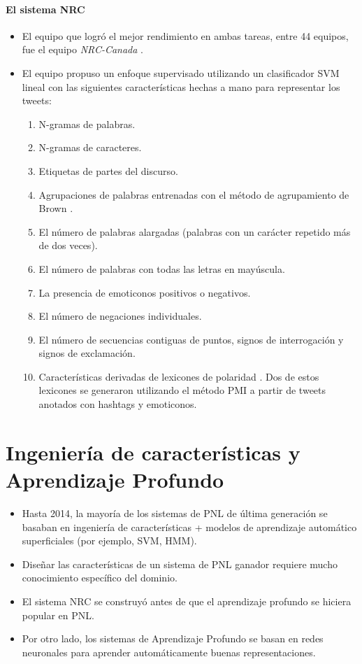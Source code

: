 \documentclass{book}
\begin{document}
\paragraph{El sistema NRC}
\begin{itemize}
   \item El equipo que logró el mejor rendimiento en ambas tareas, entre 44 equipos, fue el equipo \emph{NRC-Canada} \cite{Mohammad2013}.
   \item El equipo propuso un enfoque supervisado utilizando un clasificador SVM lineal con las siguientes características hechas a mano para representar los tweets:
   \begin{enumerate}
      \item N-gramas de palabras.
      \item N-gramas de caracteres.
      \item Etiquetas de partes del discurso.
      \item Agrupaciones de palabras entrenadas con el método de agrupamiento de Brown \cite{brown1992class}.
      \item El número de palabras alargadas (palabras con un carácter repetido más de dos veces).
      \item El número de palabras con todas las letras en mayúscula.
      \item La presencia de emoticonos positivos o negativos.
      \item El número de negaciones individuales.
      \item El número de secuencias contiguas de puntos, signos de interrogación y signos de exclamación.
      \item Características derivadas de lexicones de polaridad \cite{Mohammad2013}. Dos de estos lexicones se generaron utilizando el método PMI a partir de tweets anotados con hashtags y emoticonos.
   \end{enumerate}
\end{itemize}

\section{Ingeniería de características y Aprendizaje Profundo}

\begin{itemize}
   \item Hasta 2014, la mayoría de los sistemas de PNL de última generación se basaban en ingeniería de características + modelos de aprendizaje automático superficiales (por ejemplo, SVM, HMM).
   \item Diseñar las características de un sistema de PNL ganador requiere mucho conocimiento específico del dominio.
   \item El sistema NRC se construyó antes de que el aprendizaje profundo se hiciera popular en PNL.
   \item Por otro lado, los sistemas de Aprendizaje Profundo se basan en redes neuronales para aprender automáticamente buenas representaciones.
\end{itemize}
\end{document}
